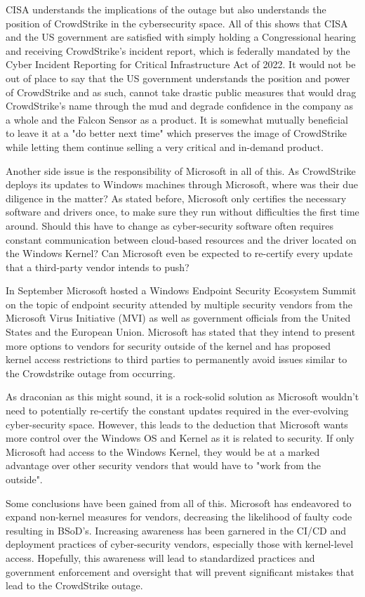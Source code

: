 CISA understands the implications of the outage but also understands the position of CrowdStrike in the cybersecurity space. All of this shows that CISA and the US government are satisfied with simply holding a Congressional hearing and receiving CrowdStrike's incident report, which is federally mandated by the Cyber Incident Reporting for Critical Infrastructure Act of 2022. It would not be out of place to say that the US government understands the position and power of CrowdStrike and as such, cannot take drastic public measures that would drag CrowdStrike's name through the mud and degrade confidence in the company as a whole and the Falcon Sensor as a product. It is somewhat mutually beneficial to leave it at a "do better next time" which preserves the image of CrowdStrike while letting them continue selling a very critical and in-demand product.

Another side issue is the responsibility of Microsoft in all of this. As CrowdStrike deploys its updates to Windows machines through Microsoft, where was their due diligence in the matter? As stated before, Microsoft only certifies the necessary software and drivers once, to make sure they run without difficulties the first time around. Should this have to change as cyber-security software often requires constant communication between cloud-based resources and the driver located on the Windows Kernel? Can Microsoft even be expected to re-certify every update that a third-party vendor intends to push? 

In September Microsoft hosted a Windows Endpoint Security Ecosystem Summit on the topic of endpoint security attended by multiple security vendors from the Microsoft Virus Initiative (MVI) as well as government officials from the United States and the European Union. Microsoft has stated that they intend to present more options to vendors for security outside of the kernel and has proposed kernel access restrictions to third parties to permanently avoid issues similar to the Crowdstrike outage from occurring.

As draconian as this might sound, it is a rock-solid solution as Microsoft wouldn't need to potentially re-certify the constant updates required in the ever-evolving cyber-security space. However, this leads to the deduction that Microsoft wants more control over the Windows OS and Kernel as it is related to security. If only Microsoft had access to the Windows Kernel, they would be at a marked advantage over other security vendors that would have to "work from the outside".

Some conclusions have been gained from all of this. Microsoft has endeavored to expand non-kernel measures for vendors, decreasing the likelihood of faulty code resulting in BSoD's. Increasing awareness has been garnered in the CI/CD and deployment practices of cyber-security vendors, especially those with kernel-level access. Hopefully, this awareness will lead to standardized practices and government enforcement and oversight that will prevent significant mistakes that lead to the CrowdStrike outage.